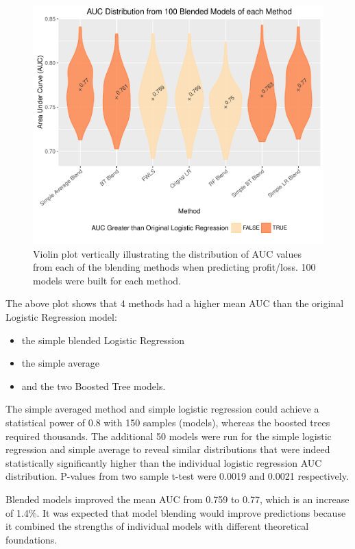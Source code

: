 \documentclass[]{elsarticle} %
\makeatletter
\providecommand{\tightlist}{%
  \setlength{\itemsep}{0pt}\setlength{\parskip}{0pt}}
\def\maxwidth{\ifdim\Gin@nat@width>\linewidth\linewidth
\else\Gin@nat@width\fi}
\let\Oldincludegraphics\includegraphics
\renewcommand{\includegraphics}[1]{\Oldincludegraphics[width=\maxwidth]{#1}}
\makeatother
\begin{document}
\begin{figure}[htbp]
\centering
\includegraphics{Consulting_Profitability_Paper_files/figure-latex/blend_violin-1.pdf}
\caption{Violin plot vertically illustrating the distribution of AUC
values from each of the blending methods when predicting profit/loss.
100 models were built for each method.}
\end{figure}

The above plot shows that 4 methods had a higher mean AUC than the
original Logistic Regression model:

\begin{itemize}
\tightlist
\item
  the simple blended Logistic Regression
\item
  the simple average
\item
  and the two Boosted Tree models.
\end{itemize}

The simple averaged method and simple logistic regression could achieve
a statistical power of 0.8 with 150 samples (models), whereas the
boosted trees required thousands. The additional 50 models were run for
the simple logistic regression and simple average to reveal similar
distributions that were indeed statistically significantly higher than
the individual logistic regression AUC distribution. P-values from two
sample t-test were 0.0019 and 0.0021 respectively.

Blended models improved the mean AUC from 0.759 to 0.77, which is an
increase of 1.4\%. It was expected that model blending would improve
predictions because it combined the strengths of individual models with
different theoretical foundations.
\end{document}
